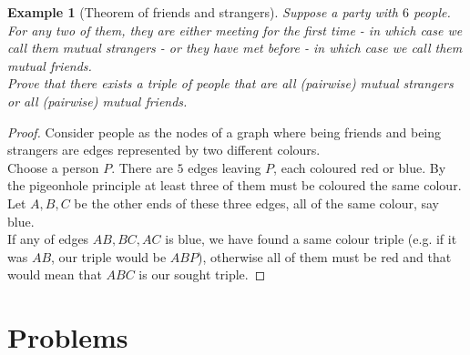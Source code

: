 \documentclass[12pt,a4paper]{article}
\newtheorem{theorem}{Example}
\begin{document}
\begin{theorem}[Theorem of friends and strangers]
Suppose a party with $6$ people. For any two of them, they are either meeting for the first time - in which case we call them mutual strangers - or they have met before - in which case we call them mutual friends.\\
Prove that there exists a triple of people that are all (pairwise) mutual strangers or all (pairwise) mutual friends.
\end{theorem}
\begin{proof}
Consider people as the nodes of a graph where being friends and being strangers are edges represented by two different colours.\\
Choose a person $P$. There are $5$ edges leaving $P$, each coloured red or blue. By the pigeonhole principle at least three of them must be coloured the same colour. Let $A,B,C$ be the other ends of these three edges, all of the same colour, say blue.\\
If any of edges $AB, BC, AC$ is blue, we have found a same colour triple (e.g. if it was $AB$, our triple would be $ABP$), otherwise all of them must be red and that would mean that $ABC$ is our sought triple.
\end{proof}

\section{Problems}
\end{document}
